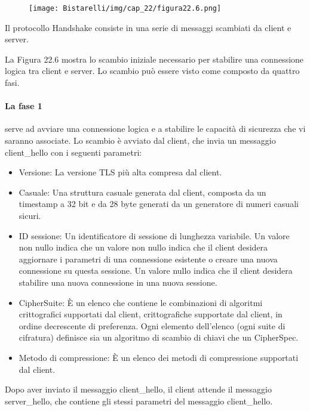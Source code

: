 \singlespacing

\begin{figure}[H]
	\centering
    \texttt{[image: Bistarelli/img/cap\_22/figura22.6.png]}
\end{figure}

Il protocollo Handshake consiste in una serie di messaggi scambiati da client e server.

\singlespacing

La Figura 22.6 mostra lo scambio iniziale necessario per stabilire una connessione logica tra client e server. Lo scambio può essere visto come composto da quattro fasi. 

\paragraph{La fase 1} serve ad avviare una connessione logica e a stabilire le capacità di sicurezza che vi saranno associate. Lo scambio è avviato dal client, che invia un messaggio client\_hello con i seguenti parametri:

\begin{itemize}
    \item Versione: La versione TLS più alta compresa dal client.
    
    \item Casuale: Una struttura casuale generata dal client, composta da un timestamp a 32 bit e da 28 byte generati da un generatore di numeri casuali sicuri.
    
    \item ID sessione: Un identificatore di sessione di lunghezza variabile. Un valore non nullo indica che un valore non nullo indica che il client desidera aggiornare i parametri di una connessione esistente o creare una nuova connessione su questa sessione. Un valore nullo indica che il client desidera stabilire una nuova connessione in una nuova sessione.
    
    \item CipherSuite: È un elenco che contiene le combinazioni di algoritmi crittografici supportati dal client, crittografiche supportate dal client, in ordine decrescente di preferenza. Ogni elemento dell'elenco (ogni suite di cifratura) definisce sia un algoritmo di scambio di chiavi che un CipherSpec.
    
    \item Metodo di compressione: È un elenco dei metodi di compressione supportati dal client.
\end{itemize}
Dopo aver inviato il messaggio client\_hello, il client attende il messaggio server\_hello, che contiene gli stessi parametri del messaggio client\_hello.

